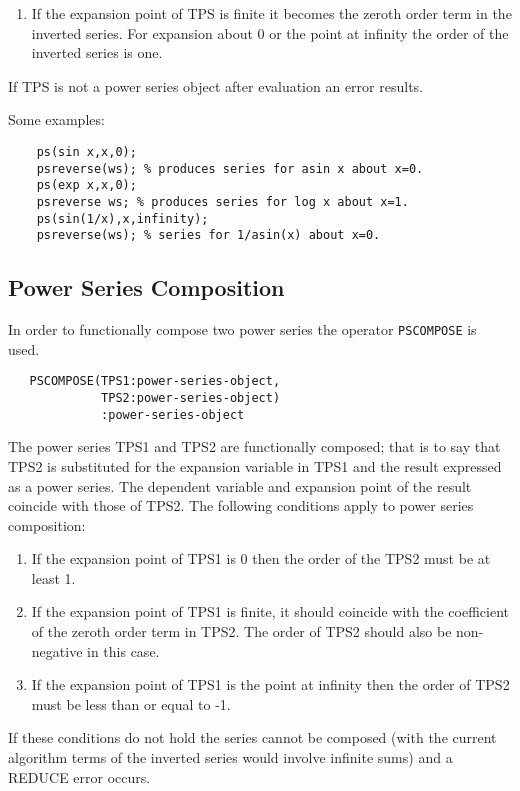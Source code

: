 {\begin{enumerate}
\item If the expansion point of TPS is finite it becomes the
zeroth order term in the inverted series. For expansion about 0 or the
point at infinity the order of the inverted series is one.
\end{enumerate}

If TPS is not a power series object after evaluation an error results.

Some examples:
\begin{verbatim}
    ps(sin x,x,0);
    psreverse(ws); % produces series for asin x about x=0.
    ps(exp x,x,0);
    psreverse ws; % produces series for log x about x=1.
    ps(sin(1/x),x,infinity);
    psreverse(ws); % series for 1/asin(x) about x=0.
\end{verbatim}

\subsection{Power Series Composition}
\hypertarget{operator:PSCOMPOSE}{}
In order to functionally compose two power series the operator
\texttt{PSCOMPOSE} is used. 
\begin{verbatim}
   PSCOMPOSE(TPS1:power-series-object,
             TPS2:power-series-object)
             :power-series-object
\end{verbatim}
The power series TPS1 and TPS2 are functionally composed;
that is to say that TPS2 is substituted for the expansion
variable in TPS1 and the result expressed as a power series. The
dependent variable and expansion point of the result coincide with
those of TPS2.  The following conditions apply to power series
composition:

\begin{enumerate}
\item If the expansion point of TPS1 is 0 then the order of the
TPS2 must be at least 1.

\item If the expansion point of TPS1 is finite, it should
coincide with the coefficient of the zeroth order term in TPS2.
The order of TPS2 should also be non-negative in this case.

\item If the expansion point of TPS1 is the point at infinity
then the order of TPS2 must be less than or equal to -1.
\end{enumerate}

If these conditions do not hold the series cannot be composed (with
the current algorithm terms of the inverted series would involve
infinite sums) and a REDUCE error occurs.

}
